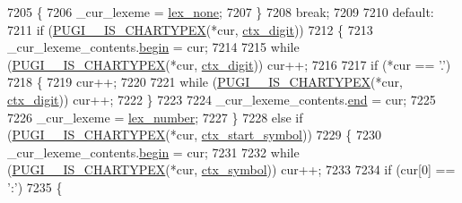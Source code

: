\begin{DoxyCode}
7205                 \{
7206                     \_cur\_lexeme = \hyperlink{pugixml_8cpp_a1fdd6d0a63acbba1491ab331ddce4ac9a6696dceb02e4d282197154d3805e8ce1}{lex\_none};
7207                 \}
7208                 \textcolor{keywordflow}{break};
7209 
7210             \textcolor{keywordflow}{default}:
7211                 \textcolor{keywordflow}{if} (\hyperlink{pugixml_8cpp_a4ce684b35edc78e6fda91e836f29a46c}{PUGI\_\_IS\_CHARTYPEX}(*cur, \hyperlink{pugixml_8cpp_af8255f70e16ba8c6dbd5ff66cef9af26a1e66040284fe331a2ec2162b6b9fee6a}{ctx\_digit}))
7212                 \{
7213                     \_cur\_lexeme\_contents.\hyperlink{structxpath__lexer__string_a0b985863d7363a75d4fdd0a7ece1fca0}{begin} = cur;
7214 
7215                     \textcolor{keywordflow}{while} (\hyperlink{pugixml_8cpp_a4ce684b35edc78e6fda91e836f29a46c}{PUGI\_\_IS\_CHARTYPEX}(*cur, \hyperlink{pugixml_8cpp_af8255f70e16ba8c6dbd5ff66cef9af26a1e66040284fe331a2ec2162b6b9fee6a}{ctx\_digit})) cur++;
7216                 
7217                     \textcolor{keywordflow}{if} (*cur == \textcolor{charliteral}{'.'})
7218                     \{
7219                         cur++;
7220 
7221                         \textcolor{keywordflow}{while} (\hyperlink{pugixml_8cpp_a4ce684b35edc78e6fda91e836f29a46c}{PUGI\_\_IS\_CHARTYPEX}(*cur, 
      \hyperlink{pugixml_8cpp_af8255f70e16ba8c6dbd5ff66cef9af26a1e66040284fe331a2ec2162b6b9fee6a}{ctx\_digit})) cur++;
7222                     \}
7223 
7224                     \_cur\_lexeme\_contents.\hyperlink{structxpath__lexer__string_a13bbedeca2f8c2fb1e294325eea66878}{end} = cur;
7225 
7226                     \_cur\_lexeme = \hyperlink{pugixml_8cpp_a1fdd6d0a63acbba1491ab331ddce4ac9abe562e581d64a34b55b3d9b38db2e480}{lex\_number};
7227                 \}
7228                 \textcolor{keywordflow}{else} \textcolor{keywordflow}{if} (\hyperlink{pugixml_8cpp_a4ce684b35edc78e6fda91e836f29a46c}{PUGI\_\_IS\_CHARTYPEX}(*cur, 
      \hyperlink{pugixml_8cpp_af8255f70e16ba8c6dbd5ff66cef9af26a934b9be54f1b4446a7a6665373d50ad6}{ctx\_start\_symbol}))
7229                 \{
7230                     \_cur\_lexeme\_contents.\hyperlink{structxpath__lexer__string_a0b985863d7363a75d4fdd0a7ece1fca0}{begin} = cur;
7231 
7232                     \textcolor{keywordflow}{while} (\hyperlink{pugixml_8cpp_a4ce684b35edc78e6fda91e836f29a46c}{PUGI\_\_IS\_CHARTYPEX}(*cur, \hyperlink{pugixml_8cpp_af8255f70e16ba8c6dbd5ff66cef9af26a7f60ee1dbb91625306756d7b8289162e}{ctx\_symbol})) cur++;
7233 
7234                     \textcolor{keywordflow}{if} (cur[0] == \textcolor{charliteral}{':'})
7235                     \{

\end{DoxyCode}
